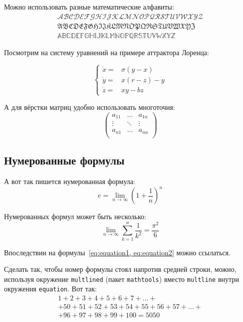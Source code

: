 Можно использовать разные математические алфавиты:
\begin{align}
    \mathcal{ABCDEFGHIJKLMNOPQRSTUVWXYZ} \nonumber  \\
    \mathfrak{ABCDEFGHIJKLMNOPQRSTUVWXYZ} \nonumber \\
    \mathbb{ABCDEFGHIJKLMNOPQRSTUVWXYZ} \nonumber
\end{align}

Посмотрим на систему уравнений на примере аттрактора Лоренца:

\[
\left\{
\begin{array}{rl}
    \dot x = & \sigma (y-x)  \\
    \dot y = & x (r - z) - y \\
    \dot z = & xy - bz
\end{array}
\right.
\]

А для вёрстки матриц удобно использовать многоточия:
\[
    \left(
        \begin{array}{ccc}
            a_{11} & \ldots & a_{1n} \\
            \vdots & \ddots & \vdots \\
            a_{n1} & \ldots & a_{nn} \\
        \end{array}
    \right)
\]

\subsection{Нумерованные формулы}\label{subsec:ch5/sec3/sub3}

А вот так пишется нумерованная формула:
\begin{equation}
    \label{eq:equation1}
    e = \lim_{n \to \infty} \left( 1+\frac{1}{n} \right) ^n
\end{equation}

Нумерованных формул может быть несколько:
\begin{equation}
    \label{eq:equation2}
    \lim_{n \to \infty} \sum_{k=1}^n \frac{1}{k^2} = \frac{\pi^2}{6}
\end{equation}

Впоследствии на формулы~\cref{eq:equation1, eq:equation2} можно ссылаться.

Сделать так, чтобы номер формулы стоял напротив средней строки, можно,
используя окружение \verb|multlined| (пакет \verb|mathtools|) вместо
\verb|multline| внутри окружения \verb|equation|. Вот так:
\begin{equation} %
    \label{eq:equation3}
    \begin{multlined}
        1+ 2+3+4+5+6+7+\dots + \\
        + 50+51+52+53+54+55+56+57 + \dots + \\
        + 96+97+98+99+100=5050
    \end{multlined}
\end{equation}

